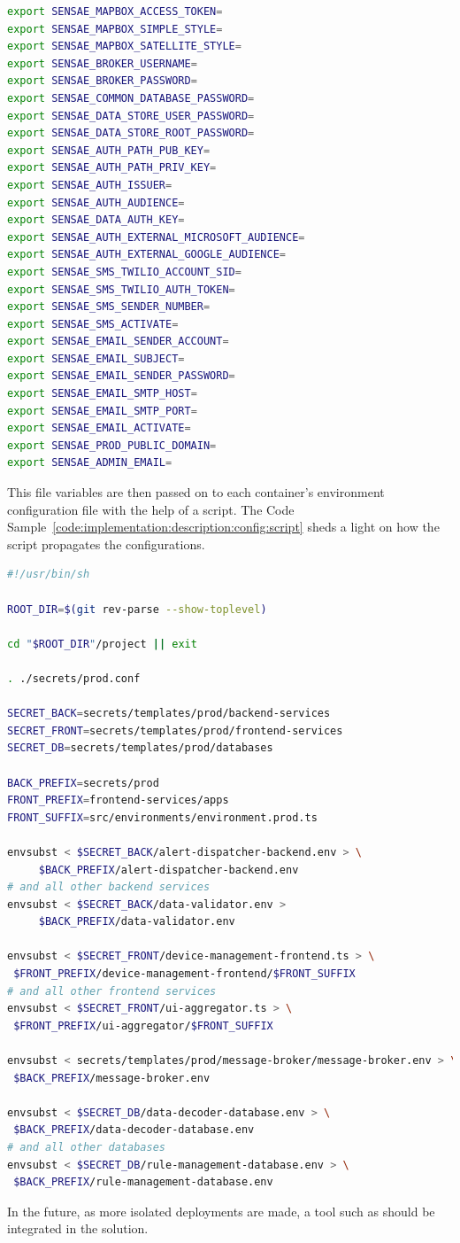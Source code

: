 \begin{lstlisting}[language=bash, style=bash, caption=Configuration File for Production Environment, label={code:implementation:description:config:file}]
export SENSAE_MAPBOX_ACCESS_TOKEN=
export SENSAE_MAPBOX_SIMPLE_STYLE=
export SENSAE_MAPBOX_SATELLITE_STYLE=
export SENSAE_BROKER_USERNAME=
export SENSAE_BROKER_PASSWORD=
export SENSAE_COMMON_DATABASE_PASSWORD=
export SENSAE_DATA_STORE_USER_PASSWORD=
export SENSAE_DATA_STORE_ROOT_PASSWORD=
export SENSAE_AUTH_PATH_PUB_KEY=
export SENSAE_AUTH_PATH_PRIV_KEY=
export SENSAE_AUTH_ISSUER=
export SENSAE_AUTH_AUDIENCE=
export SENSAE_DATA_AUTH_KEY=
export SENSAE_AUTH_EXTERNAL_MICROSOFT_AUDIENCE=
export SENSAE_AUTH_EXTERNAL_GOOGLE_AUDIENCE=
export SENSAE_SMS_TWILIO_ACCOUNT_SID=
export SENSAE_SMS_TWILIO_AUTH_TOKEN=
export SENSAE_SMS_SENDER_NUMBER=
export SENSAE_SMS_ACTIVATE=
export SENSAE_EMAIL_SENDER_ACCOUNT=
export SENSAE_EMAIL_SUBJECT=
export SENSAE_EMAIL_SENDER_PASSWORD=
export SENSAE_EMAIL_SMTP_HOST=
export SENSAE_EMAIL_SMTP_PORT=
export SENSAE_EMAIL_ACTIVATE=
export SENSAE_PROD_PUBLIC_DOMAIN=
export SENSAE_ADMIN_EMAIL=
\end{lstlisting}

This file variables are then passed on to each container's environment configuration file with the help of a script. The Code Sample~\ref{code:implementation:description:config:script} sheds a light on how the script propagates the configurations.

\begin{lstlisting}[language=bash, style=bash, caption=Configuration Propagation Script, label={code:implementation:description:config:script}]
#!/usr/bin/sh

ROOT_DIR=$(git rev-parse --show-toplevel)

cd "$ROOT_DIR"/project || exit

. ./secrets/prod.conf

SECRET_BACK=secrets/templates/prod/backend-services
SECRET_FRONT=secrets/templates/prod/frontend-services
SECRET_DB=secrets/templates/prod/databases

BACK_PREFIX=secrets/prod
FRONT_PREFIX=frontend-services/apps
FRONT_SUFFIX=src/environments/environment.prod.ts

envsubst < $SECRET_BACK/alert-dispatcher-backend.env > \
     $BACK_PREFIX/alert-dispatcher-backend.env
# and all other backend services
envsubst < $SECRET_BACK/data-validator.env >
     $BACK_PREFIX/data-validator.env

envsubst < $SECRET_FRONT/device-management-frontend.ts > \
 $FRONT_PREFIX/device-management-frontend/$FRONT_SUFFIX
# and all other frontend services
envsubst < $SECRET_FRONT/ui-aggregator.ts > \
 $FRONT_PREFIX/ui-aggregator/$FRONT_SUFFIX

envsubst < secrets/templates/prod/message-broker/message-broker.env > \
 $BACK_PREFIX/message-broker.env

envsubst < $SECRET_DB/data-decoder-database.env > \
 $BACK_PREFIX/data-decoder-database.env
# and all other databases
envsubst < $SECRET_DB/rule-management-database.env > \
 $BACK_PREFIX/rule-management-database.env
\end{lstlisting}

In the future, as more isolated deployments are made, a tool such as  should be integrated in the solution.
